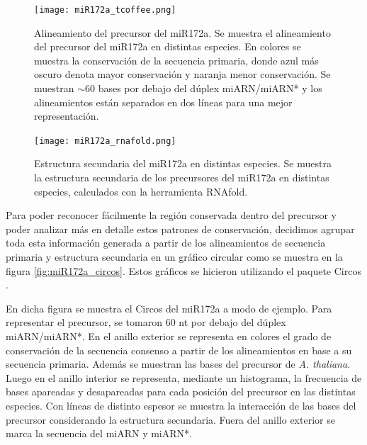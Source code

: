 \begin{landscape}
    \begin{figure}[htbp!] 
        \centering    
        \texttt{[image: miR172a\_tcoffee.png]}
        \caption[Alineamiento del precursor del miR172a.]{Alineamiento del precursor del miR172a. 
        Se muestra el alineamiento del precursor del miR172a en distintas especies. 
        En colores se muestra la conservación de la secuencia primaria, donde azul más oscuro denota mayor conservación y naranja menor conservación.
        Se muestran $\sim$60 bases por debajo del dúplex miARN/miARN* y los alineamientos están separados en dos líneas para una mejor representación.}
         \label{fig:miR172a_tcoffee}
    \end{figure}
\end{landscape}


\begin{landscape}
    \begin{figure}[htbp!] 
        \centering    
        \texttt{[image: miR172a\_rnafold.png]}
        \caption[Estructura secundaria del miR172a en distintas especies]{
        Estructura secundaria del miR172a en distintas especies.
        Se muestra la estructura secundaria de los precursores del miR172a en distintas especies, calculados con la herramienta RNAfold.
        }
        \label{fig:miR172a_rnafold}
    \end{figure}
\end{landscape}

Para poder reconocer fácilmente la región conservada dentro del precursor y poder analizar más en detalle estos patrones de conservación, decidimos agrupar toda esta información
 generada a partir de los alineamientos de secuencia primaria y estructura secundaria en un gráfico circular como se muestra en la figura \ref{fig:miR172a_circos}.
Estos gráficos se hicieron utilizando el paquete Circos \citep{pmid19541911}.
 
En dicha figura se muestra el Circos del miR172a a modo de ejemplo.
Para representar el precursor, se tomaron 60 nt por debajo del dúplex miARN/miARN*.
En el anillo exterior se representa en colores el grado de conservación de la secuencia consenso a partir de los alineamientos en base a su secuencia primaria.
Además se muestran las bases del precursor de \textit {A. thaliana}.
Luego en el anillo interior se representa, mediante un histograma, la frecuencia de bases apareadas y desapareadas para cada posición del precursor en las distintas especies.
Con líneas de distinto espesor se muestra la interacción de las bases del precursor considerando la estructura secundaria. 
Fuera del anillo exterior se marca la secuencia del miARN y miARN*.

